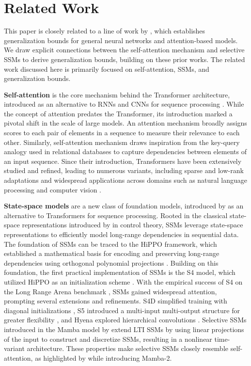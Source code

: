 \section{Related Work}
This paper is closely related to a line of work by \citet{bartlett2017spectrally, edelman2022inductive, trauger2024length_independent_transformer}, which establishes generalization bounds for general neural networks and attention-based models. We draw explicit connections between the self-attention mechanism and selective SSMs to derive generalization bounds, building on these prior works. The related work discussed here is primarily focused on self-attention, SSMs, and generalization bounds.

\textbf{Self-attention} is the core mechanism behind the Transformer architecture, introduced as an alternative to RNNs and CNNs for sequence processing \cite{vaswani2017attention}. While the concept of attention predates the Transformer, its introduction marked a pivotal shift in the scale of large models. An attention mechanism broadly assigns scores to each pair of elements in a sequence to measure their relevance to each other. Similarly, self-attention mechanism draws inspiration from the key-query analogy used in relational databases to capture dependencies between elements of an input sequence. Since their introduction, Transformers have been extensively studied and refined, leading to numerous variants, including sparse and low-rank adaptations and widespread applications across domains such as natural language processing \cite{devlin2018bert, brown2020gpt3} and computer vision \cite{dosovitskiy2020vision_transformer, peebles2023scalable_diffusion_transformer, liu2024diffusion_vision_transformer}.

\textbf{State-space models} are a new class of foundation models, introduced by \citet{gu2021ssm} as an alternative to Transformers for sequence processing. Rooted in the classical state-space representations introduced by \citet{kalman1960new} in control theory, SSMs leverage state-space representations to efficiently model long-range dependencies in sequential data. The foundation of SSMs can be traced to the HiPPO framework, which established a mathematical basis for encoding and preserving long-range dependencies using orthogonal polynomial projections \cite{gu2020hippo}. Building on this foundation, the first practical implementation of SSMs is the S4 model, which utilized HiPPO as an initialization scheme \cite{gu2022s4}. With the empirical success of S4 on the Long Range Arena benchmark \cite{tay2021long_range_arena}, SSMs gained widespread attention, prompting several extensions and refinements. S4D simplified training with diagonal initializations \cite{gu2022s4d}, S5 introduced a multi-input multi-output structure for greater flexibility \cite{smith2023s5}, and Hyena explored hierarchical convolutions \cite{poli2023hyena}. Selective SSMs introduced in the Mamba model by \citet{gu2024mamba} extend LTI SSMs by using linear projections of the input to construct and discretize SSMs, resulting in a nonlinear time-variant architecture. These properties make selective SSMs closely resemble self-attention, as highlighted by \citet{dao2024transformers_are_ssms} while introducing Mamba-2. 

